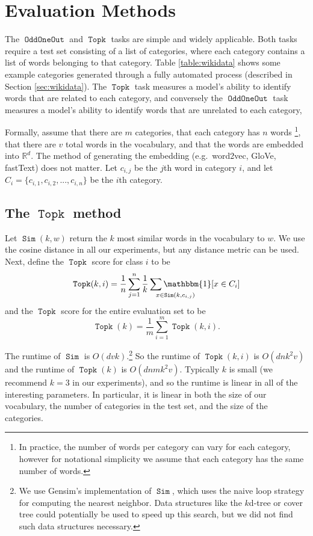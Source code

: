\documentclass[11pt,a4paper]{article}
\newcommand{\indicator}[1]{\mathbbm{1}\!\left[{#1}\right]}
\DeclareMathOperator{\FindMostSimilar}{\texttt{Sim}}
\DeclareMathOperator{\OddOneOut}{\texttt{OddOneOut}}
\DeclareMathOperator{\topk}{\texttt{Topk}}
\newcommand{\fixme}[1]{{\color{red}\itshape \textbf{FIXME:} {#1}}}
\begin{document}
\section{Evaluation Methods}
\label{sec:method}
The $\OddOneOut$ and $\topk$ tasks are simple and widely applicable.
Both tasks require a test set consisting of a list of categories,
where each category contains a list of words belonging to that category.
Table \ref{table:wikidata} shows some example categories generated through a fully automated process (described in Section \ref{sec:wikidata}).
The $\topk$ task measures a model's ability to identify words that are related to each category,
and conversely the $\OddOneOut$ task measures a model's ability to identify words that are unrelated to each category,

Formally,
assume that there are $m$ categories,
that each category has $n$ words%
\footnote{
    In practice, the number of words per category can vary for each category,
    however for notational simplicity we assume that each category has the same number of words.
},
that there are $v$ total words in the vocabulary,
and that the words are embedded into $\mathbb {R}^d$.
The method of generating the embedding (e.g.\ word2vec, GloVe, fastText) does not matter.
Let $c_{i,j}$ be the $j$th word in category $i$,
and let $C_i = \{c_{i,1}, c_{i,2}, ..., c_{i,n}\}$ be the $i$th category.

\subsection{The $\topk$ method}
Let $\FindMostSimilar(k,w)$ return the $k$ most similar words in the vocabulary to $w$.
We use the cosine distance in all our experiments,
but any distance metric can be used.
Next, define the $\topk$ score for class $i$ to be
\begin{equation}
    \topk(k,i) = \frac{1}{n}\sum_{j=1}^n \frac{1}{k}\sum_{\mathrlap{x \in \FindMostSimilar(k, c_{i,j})}} \indicator{x \in C_i}
\end{equation}
and the $\topk$ score for the entire evaluation set to be
\begin{equation}
    \topk(k) = \frac{1}{m}\sum_{i=1}^m \topk(k,i)
    .
\end{equation}

The runtime of $\FindMostSimilar$ is $O(dvk)$.\footnote{
    We use Gensim's implementation of $\FindMostSimilar$,
    which uses the naive loop strategy for computing the nearest neighbor.
    Data structures like the $k$d-tree or cover tree could potentially be used to speed up this search,
    but we did not find such data structures necessary.
}
So the runtime of $\topk(k,i)$ is $O(dnk^2v)$
and the runtime of $\topk(k)$ is $O(dnmk^2v)$.
Typically $k$ is small (we recommend $k=3$ in our experiments),
and so the runtime is linear in all of the interesting parameters.
In particular, it is linear in both the size of our vocabulary, the number of categories in the test set, and the size of the categories.
\end{document}
